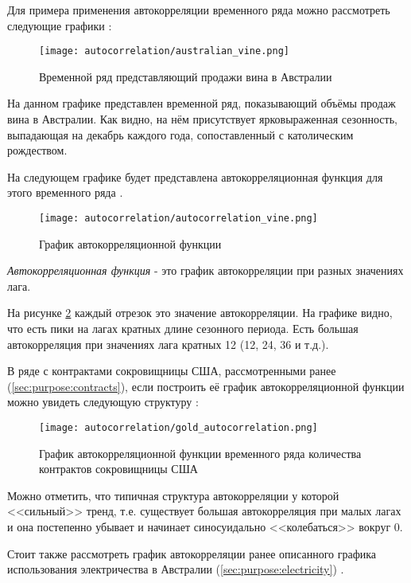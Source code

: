 Для примера применения автокорреляции временного ряда можно рассмотреть следующие графики \cite{datamining_in_action}:

\begin{figure}[h]
\centering
	\texttt{[image: autocorrelation/australian\_vine.png]}
	\caption{Временной ряд представляющий продажи вина в Австралии}
	\label{sec:autocorrelation:vine}
\end{figure}

На данном графике представлен временной ряд, показывающий объёмы продаж вина в Австралии. Как видно, на нём присутствует ярковыраженная сезонность, выпадающая на декабрь каждого года, сопоставленный с католическим рождеством.

На следующем графике будет представлена автокорреляционная функция для этого временного ряда \cite{datamining_in_action}.

\begin{figure}[h]
\centering
	\texttt{[image: autocorrelation/autocorrelation\_vine.png]}
	\caption{График автокорреляционной функции}
	\label{sec:autocorrelation:vine_auto}
\end{figure}

\textit{Автокорреляционная функция} - это график автокорреляции при разных значениях лага.

На рисунке \ref{sec:autocorrelation:vine_auto} каждый отрезок это значение автокорреляции. На графике видно, что есть пики на лагах кратных длине сезонного периода. Есть большая автокорреляция при значениях лага кратных 12 (12, 24, 36 и т.д.).

В ряде с контрактами сокровищницы США, рассмотренными ранее (\ref{sec:purpose:contracts}), если построить её график автокорреляционной функции можно увидеть следующую структуру \cite{datamining_in_action}:

\begin{figure}[h]
\centering
	\texttt{[image: autocorrelation/gold\_autocorrelation.png]}
	\caption{График автокорреляционной функции временного ряда количества контрактов сокровищницы США}
	\label{sec:autocorrelation:autocorrelation_usa_gold}
\end{figure}

Можно отметить, что типичная структура автокорреляции у которой <<сильный>> тренд, т.е. существует большая автокорреляция при малых лагах и она постепенно убывает и начинает синосуидально <<колебаться>> вокруг 0.

Стоит также рассмотреть график автокорреляции ранее описанного графика использования электричества в Австралии (\ref{sec:purpose:electricity}) \cite{datamining_in_action}.

